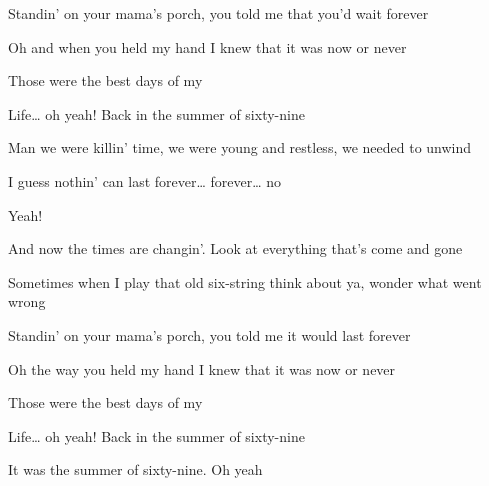\begin{song}
\bigskip

 Standin’ on your mama’s porch,  you told me that you’d wait forever \par
{} Oh and when you held my hand  I knew that it was now or never \par
{} Those were the best days of my \par
{}Life… oh yeah! Back in the summer of sixty-nine  \par

\bigskip

 Man we were killin’ time, we were young and restless, we needed to unwind \par
{} I guess nothin’ can last forever… forever… no \par
{}Yeah!    \par

\bigskip

 And now the times are changin’.  Look at everything that’s come and gone \par
{} Sometimes when I play that old six-string  think about ya, wonder what went wrong \par

\bigskip

 Standin’ on your mama’s porch,  you told me it would last forever \par
{} Oh the way you held my hand  I knew that it was now or never \par
{} Those were the best days of my \par
{}Life… oh yeah! Back in the summer of sixty-nine  \par
It was the summer of sixty-nine. Oh yeah   \par
{} \par

\end{song}
